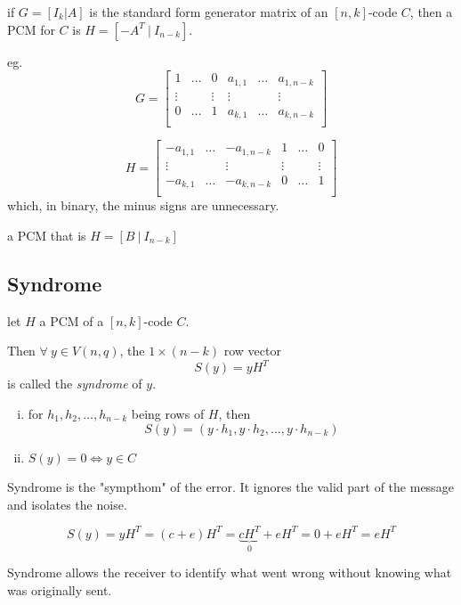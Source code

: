 \documentclass{article}
\theoremstyle{definition}
\newenvironment{defn}[1]
{\renewcommand\theinnerdefn{#1}\innerdefn}
{\endinnerdefn}
\newenvironment{thm}[1]
{\renewcommand\theinnerthm{#1}\innerthm}
{\endinnerthm}
\newenvironment{remark}[1]
{\renewcommand\theinnerrem{#1}\innerrem}
{\endinnerrem}
\newenvironment{intuition}[1]
{\renewcommand\theinnerintu{#1}\innerintu}
{\endinnerintu}
\newcommand{\Vnq}{V(n, q)}
\begin{document}
\vspace{0.5cm}
\begin{thm}{7.6} \label{7.6}
  if $G= [I_k | A]$ is the standard form generator matrix of an $[n,k]$-code $C$, then a PCM for $C$ is $H=[-A^T ~|~ I_{n-k}]$.

  eg.
$$G = \begin{bmatrix}
  1 & \ldots & 0 & a_{1,1} & \ldots & a_{1, n-k} \\
  \vdots & & \vdots & \vdots & & \vdots \\
  0 & \ldots & 1 & a_{k,1} & \ldots & a_{k, n-k} \\
\end{bmatrix}$$

$$H = \begin{bmatrix}
  -a_{1,1} & \ldots & -a_{1, n-k} & 1 & \ldots & 0 \\
  \vdots & & \vdots & \vdots & & \vdots \\
  -a_{k,1} & \ldots & -a_{k, n-k} & 0 & \ldots & 1 \\
\end{bmatrix}$$
which, in binary, the minus signs are unnecessary.
\end{thm}

\begin{defn}{}[Standard form]
  a PCM that is $H = [B ~|~ I_{n-k}]$
\end{defn}

\subsection{Syndrome}
\begin{defn}{}[Syndrome]
  let $H$ a PCM of a $[n,k]$-code $C$.

  Then $\forall~ y \in \Vnq$, the $1 \times (n-k)$ row vector
  $$S(y) = y H^T$$
  is called the \emph{syndrome} of $y$.
\end{defn}

\begin{remark}{}
  \begin{enumerate}[i.]
    \item for $h_1, h_2, \ldots, h_{n-k}$ being rows of $H$, then
      $$S(y) = (y \cdot h_1, y \cdot h_2, \ldots, y \cdot h_{n-k})$$
    \item $S(y)=0 \Longleftrightarrow y \in C$
  \end{enumerate}
\end{remark}

\begin{intuition}{}
  Syndrome is the "sympthom" of the error. It ignores the valid part of the message and isolates the noise.

  $$S(y) = y H^T = (c+e)H^T = \underbrace{cH^T}_{0} + eH^T = 0+eH^T = e H^T$$

  Syndrome allows the receiver to identify what went wrong without knowing what was originally sent.
\end{intuition}
\end{document}
